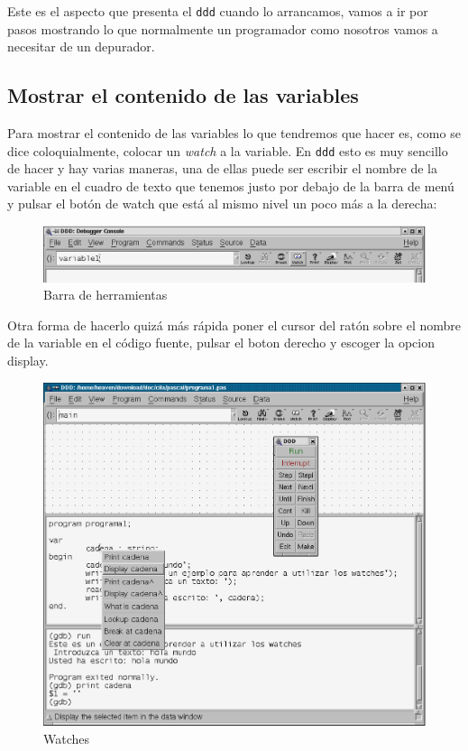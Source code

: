 Este es  el aspecto que  presenta el  {\tt ddd} cuando  lo arrancamos,
vamos a ir por pasos mostrando  lo que normalmente un programador como
nosotros vamos a necesitar de un depurador.

\subsection{Mostrar el contenido de las variables}

Para mostrar el contenido de las  variables lo que tendremos que hacer
es, como se dice coloquialmente, colocar un {\em watch} a la variable.
En {\tt ddd} esto  es muy sencillo de hacer y  hay varias maneras, una
de ellas puede ser  escribir el nombre de la variable  en el cuadro de
texto que  tenemos justo por  debajo de la barra  de menú y  pulsar el
botón de watch que está al mismo nivel un poco más a la derecha:

\begin{figure}[hbtp]
\centering
\includegraphics[width=\textwidth]{imagenes/ddd_watch.eps}
\caption{Barra de herramientas}
\end{figure}

Otra forma de hacerlo quizá más rápida poner el cursor del ratón sobre
el nombre de la variable en  el código fuente, pulsar el boton derecho
y escoger la opcion display.

\begin{figure}[hbtp]
\centering
\includegraphics[width=\textwidth]{imagenes/ddd_watchII.eps}
\caption{Watches}
\end{figure}

